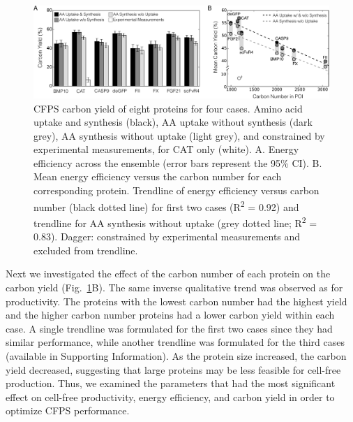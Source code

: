 \documentclass[journal=asbcd6,manuscript=article]{achemso}
\begin{document}
\begin{figure}[t!]
\centering
\includegraphics[width=1.00\textwidth]{./Figures/CarbonYield.pdf}
\caption{CFPS carbon yield of eight proteins for four cases. Amino acid uptake and synthesis (black), AA uptake without synthesis (dark grey), AA synthesis without uptake (light grey), and constrained by experimental measurements, for CAT only (white). A. Energy efficiency across the ensemble (error bars represent the 95\% CI). B. Mean energy efficiency versus the carbon number for each corresponding protein. Trendline of energy efficiency versus carbon number (black dotted line) for first two cases  (R\textsuperscript{2} = 0.92) and trendline for AA synthesis without uptake (grey dotted line; R\textsuperscript{2} = 0.83). Dagger: constrained by experimental measurements and excluded from trendline.}
\label{fig:Yield}
\end{figure}
Next we investigated the effect of the carbon number of each protein on the carbon yield (Fig.~\ref{fig:Yield}B).
The same inverse qualitative trend was observed as for productivity.
The proteins with the lowest carbon number had the highest yield and the higher carbon number proteins had a lower carbon yield within each case.
A single trendline was formulated for the first two cases since they had similar performance, while another trendline was formulated for the third cases (available in Supporting Information).
As the protein size increased, the carbon yield decreased, suggesting that large proteins may be less feasible for cell-free production.
Thus, we examined the parameters that had the most significant effect on cell-free productivity, energy efficiency, and carbon yield in order to optimize CFPS performance.
\end{document}
